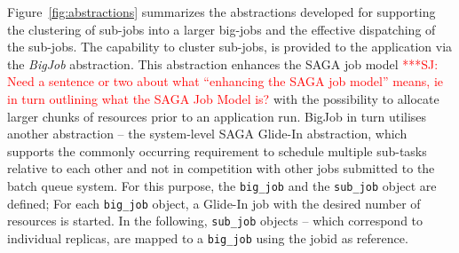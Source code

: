 \documentclass{rspublic}
\newcommand{\alnote}[1]{ {\textcolor{blue} { ***AL: #1 }}}
\newcommand{\jhanote}[1]{ {\textcolor{red} { ***SJ: #1 }}}
\newcommand{\alnote}[1]{}
\newcommand{\jhanote}[1]{}
\begin{document}
Figure~\ref{fig:abstractions} summarizes the abstractions developed
for supporting the clustering of sub-jobs into a larger big-jobs and
the effective dispatching of the sub-jobs.  The capability to cluster
sub-jobs, is provided to the application via the \emph{BigJob}
abstraction. This abstraction enhances the SAGA job model
\jhanote{Need a sentence or two about what ``enhancing the SAGA job
  model'' means, ie in turn outlining what the SAGA Job Model is?}
with the possibility to allocate larger chunks of resources prior to
an application run.  BigJob in turn utilises another abstraction --
the system-level SAGA Glide-In abstraction, which supports the commonly
occurring requirement to schedule multiple sub-tasks relative to each
other and not in competition with other jobs submitted to the batch
queue system.  For this purpose, the \texttt{big\_job} and the
\texttt{sub\_job} object are defined; For each \texttt{big\_job}
object, a Glide-In job with the desired number of resources is
started. In the following, \texttt{sub\_job} objects -- which
correspond to individual replicas, are mapped to a \texttt{big\_job}
using the jobid as reference.




%
%
   
\end{document}
